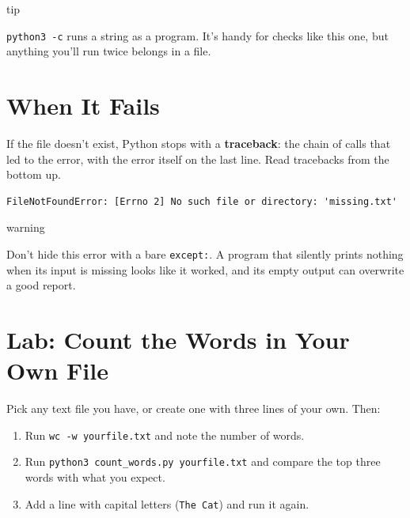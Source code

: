 \begin{callout}{tip}

\texttt{python3\ -c} runs a string as a program. It's handy for checks like this one, but anything you'll run twice belongs in a file.

\end{callout}

\section{When It Fails}\label{02-counting-words-with-python:when-it-fails}

If the file doesn't exist, Python stops with a \textbf{traceback}: the chain of calls that led to the error, with the error itself on the last line. Read tracebacks from the bottom up.

\begin{codeblock}
\begin{Verbatim}[formatcom=\outputstyle]
FileNotFoundError: [Errno 2] No such file or directory: 'missing.txt'
\end{Verbatim}
\end{codeblock}

\begin{callout}{warning}

Don't hide this error with a bare \texttt{except:}. A program that silently prints nothing when its input is missing looks like it worked, and its empty output can overwrite a good report.

\end{callout}

\section{Lab: Count the Words in Your Own File}\label{02-counting-words-with-python:lab-count-the-words-in-your-own-file}

Pick any text file you have, or create one with three lines of your own. Then:

\begin{enumerate}
\def\labelenumi{\arabic{enumi}.}
\tightlist
\item
  Run \texttt{wc\ -w\ yourfile.txt} and note the number of words.
\item
  Run \texttt{python3\ count\_}\allowbreak{}\texttt{words.}\allowbreak{}\texttt{py\ yourfile.}\allowbreak{}\texttt{txt} and compare the top three words with what you expect.
\item
  Add a line with capital letters (\texttt{The\ Cat}) and run it again.
\end{enumerate}

